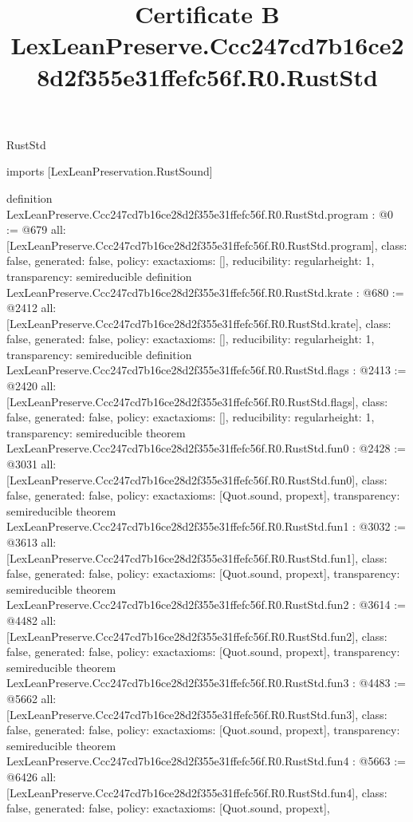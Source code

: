 \begin{lexlean}{RustStd}
\title{Certificate B LexLeanPreserve.Ccc247cd7b16ce28d2f355e31ffefc56f.R0.RustStd}
\begin{coremodule}
imports [LexLeanPreservation.RustSound]

definition LexLeanPreserve.Ccc247cd7b16ce28d2f355e31ffefc56f.R0.RustStd.program : @0 := @679 {
  all: [LexLeanPreserve.Ccc247cd7b16ce28d2f355e31ffefc56f.R0.RustStd.program],
  class: false,
  generated: false,
  policy: exact{axioms: []},
  reducibility: regular{height: 1},
  transparency: semireducible
}
definition LexLeanPreserve.Ccc247cd7b16ce28d2f355e31ffefc56f.R0.RustStd.krate : @680 := @2412 {
  all: [LexLeanPreserve.Ccc247cd7b16ce28d2f355e31ffefc56f.R0.RustStd.krate],
  class: false,
  generated: false,
  policy: exact{axioms: []},
  reducibility: regular{height: 1},
  transparency: semireducible
}
definition LexLeanPreserve.Ccc247cd7b16ce28d2f355e31ffefc56f.R0.RustStd.flags : @2413 := @2420 {
  all: [LexLeanPreserve.Ccc247cd7b16ce28d2f355e31ffefc56f.R0.RustStd.flags],
  class: false,
  generated: false,
  policy: exact{axioms: []},
  reducibility: regular{height: 1},
  transparency: semireducible
}
theorem LexLeanPreserve.Ccc247cd7b16ce28d2f355e31ffefc56f.R0.RustStd.fun0 : @2428 := @3031 {
  all: [LexLeanPreserve.Ccc247cd7b16ce28d2f355e31ffefc56f.R0.RustStd.fun0],
  class: false,
  generated: false,
  policy: exact{axioms: [Quot.sound, propext]},
  transparency: semireducible
}
theorem LexLeanPreserve.Ccc247cd7b16ce28d2f355e31ffefc56f.R0.RustStd.fun1 : @3032 := @3613 {
  all: [LexLeanPreserve.Ccc247cd7b16ce28d2f355e31ffefc56f.R0.RustStd.fun1],
  class: false,
  generated: false,
  policy: exact{axioms: [Quot.sound, propext]},
  transparency: semireducible
}
theorem LexLeanPreserve.Ccc247cd7b16ce28d2f355e31ffefc56f.R0.RustStd.fun2 : @3614 := @4482 {
  all: [LexLeanPreserve.Ccc247cd7b16ce28d2f355e31ffefc56f.R0.RustStd.fun2],
  class: false,
  generated: false,
  policy: exact{axioms: [Quot.sound, propext]},
  transparency: semireducible
}
theorem LexLeanPreserve.Ccc247cd7b16ce28d2f355e31ffefc56f.R0.RustStd.fun3 : @4483 := @5662 {
  all: [LexLeanPreserve.Ccc247cd7b16ce28d2f355e31ffefc56f.R0.RustStd.fun3],
  class: false,
  generated: false,
  policy: exact{axioms: [Quot.sound, propext]},
  transparency: semireducible
}
theorem LexLeanPreserve.Ccc247cd7b16ce28d2f355e31ffefc56f.R0.RustStd.fun4 : @5663 := @6426 {
  all: [LexLeanPreserve.Ccc247cd7b16ce28d2f355e31ffefc56f.R0.RustStd.fun4],
  class: false,
  generated: false,
  policy: exact{axioms: [Quot.sound, propext]},
}
\end{coremodule}
\end{lexlean}
